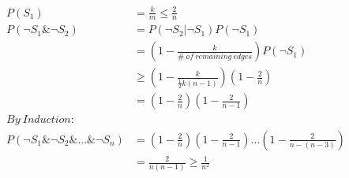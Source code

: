 \documentclass{article}
\begin{document}
\begin{align*}
	 P(S_1) &= \frac{k}{m} \leq \frac{2}{n}\\
	 P(\neg S_1 \& \neg S_2) &= P(\neg S_2 | \neg S_1)P(\neg S_1)\\
	 						&= (1-\frac{k}{\# \: of \: remaining \: edges})P(\neg S_1)\\
	 						& \geq (1 - \frac{k}{\frac{1}{2}k(n-1)})(1-\frac{2}{n})\\
	 						&=(1-\frac{2}{n})(1-\frac{2}{n-1})\\
	 By\: Induction:\\
	 P(\neg S_1 \& \neg S_2 \& ... \& \neg S_n) &= (1-\frac{2}{n})(1-\frac{2}{n-1})...(1-\frac{2}{n-(n-3)})\\
	 						&= \frac{2}{n(n-1)} \geq \frac{1}{n^2}
\end{align*}
\end{document}
